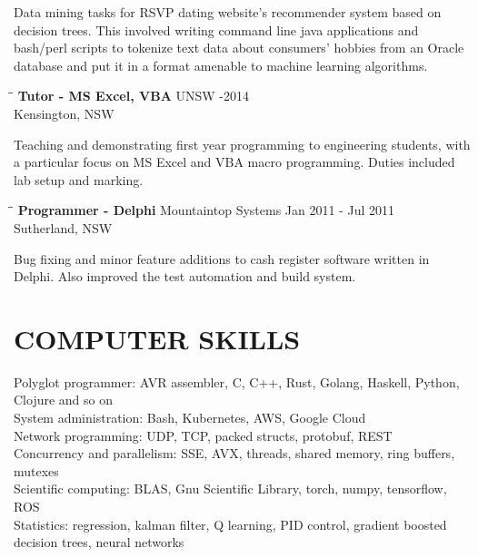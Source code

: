 \documentclass{res}
\begin{document}
\begin{resume}
    Data mining tasks for RSVP dating website's recommender system based on
    decision trees. This involved writing command line java applications and
    bash/perl scripts to tokenize text data about consumers' hobbies from an
    Oracle database and put it in a format amenable to machine learning
    algorithms.
   \begin{tabbing}
   \hspace{2.3in}\= \hspace{2.6in}\= \kill %
    {\bf Tutor - MS Excel, VBA} \>UNSW     -2014\\
                                \>Kensington, NSW
   \end{tabbing}\vspace{-20pt}      %
    Teaching and demonstrating first year programming to engineering students,
    with a particular focus on MS Excel and VBA macro programming. Duties
    included lab setup and marking.
   \begin{tabbing}
   \hspace{2.3in}\= \hspace{2.6in}\= \kill %
    {\bf Programmer - Delphi} \>Mountaintop Systems \> Jan 2011 - Jul 2011\\
                              \>Sutherland, NSW
   \end{tabbing}\vspace{-20pt}
    Bug fixing and minor feature additions to cash register software written
    in Delphi. Also improved the test automation and build system.


\section{COMPUTER SKILLS}          
    Polyglot programmer: AVR assembler, C, C++, Rust, Golang, Haskell, Python, Clojure and so on \\
    System administration: Bash, Kubernetes, AWS, Google Cloud \\
    Network programming: UDP, TCP, packed structs, protobuf, REST \\
    Concurrency and parallelism: SSE, AVX, threads, shared memory, ring buffers, mutexes \\
    Scientific computing: BLAS, Gnu Scientific Library, torch, numpy, tensorflow, ROS \\
    Statistics: regression, kalman filter, Q learning, PID control, gradient boosted decision trees, neural networks
 

\end{resume}
\end{document}
